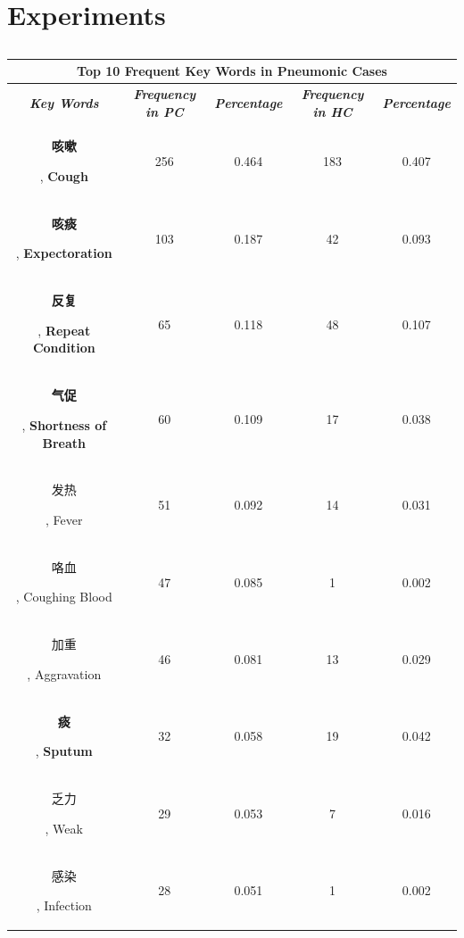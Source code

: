 \documentclass[journal]{IEEEtran}
\begin{document}
\section{Experiments}
\label{experiments}
\begin{table}[htb]
    \vspace{-0cm}
\caption{}
\vspace{-0cm}
\begin{center}
\begin{tabular}{c|c|c|c|c}
\multicolumn{5}{c}{\textbf{Top 10 Frequent Key Words in Pneumonic Cases}} \\
\hline
    \textbf{\textit{Key Words}} & \textbf{\textit{Frequency in PC}} & \textbf{\textit{Percentage}}& \textbf{\textit{Frequency in HC}}& \textbf{\textit{Percentage}} \\
\hline
\begin{CJK}{UTF8}{gbsn}\textbf{咳嗽}\end{CJK}, \textbf{Cough} & 256 & 0.464 & 183 & 0.407\\
\begin{CJK}{UTF8}{gbsn}\textbf{咳痰}\end{CJK}, \textbf{Expectoration} & 103 & 0.187 & 42 & 0.093\\
\begin{CJK}{UTF8}{gbsn}\textbf{反复}\end{CJK}, \textbf{Repeat Condition} & 65 & 0.118 & 48 & 0.107\\
\begin{CJK}{UTF8}{gbsn}\textbf{气促}\end{CJK}, \textbf{Shortness of Breath} & 60 & 0.109 & 17 & 0.038\\
\begin{CJK}{UTF8}{gbsn}发热\end{CJK}, Fever & 51 & 0.092 & 14 & 0.031\\
\begin{CJK}{UTF8}{gbsn}咯血\end{CJK}, Coughing Blood & 47 & 0.085 & 1 & 0.002\\
\begin{CJK}{UTF8}{gbsn}加重\end{CJK}, Aggravation & 46 & 0.081 & 13 & 0.029\\
\begin{CJK}{UTF8}{gbsn}\textbf{痰}\end{CJK}, \textbf{Sputum} & 32 & 0.058 & 19 & 0.042\\
\begin{CJK}{UTF8}{gbsn}乏力\end{CJK}, Weak& 29 & 0.053 & 7 & 0.016\\
\begin{CJK}{UTF8}{gbsn}感染\end{CJK}, Infection& 28 & 0.051 & 1 & 0.002\\



\end{tabular}
\end{center}
\end{table}
\end{document}
